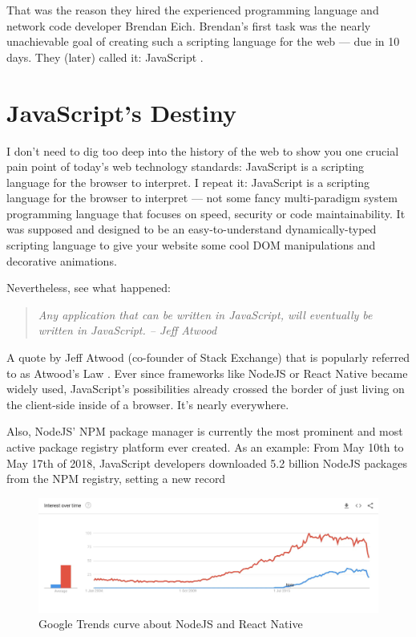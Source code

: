 \documentclass[10pt]{article}
\begin{document}
\begin{sloppypar}
  That was the reason they hired the experienced programming language and network code developer Brendan Eich. Brendan’s first task was the nearly unachievable goal of creating such a scripting language for the web — due in 10 days. They (later) called it: JavaScript \citep{severance_javascript_2012}.

  \section{JavaScript’s Destiny}
  \label{sec:javascript-destiny}

  I don’t need to dig too deep into the history of the web to show you one crucial pain point of today’s web technology standards: JavaScript is a scripting language for the browser to interpret. I repeat it: JavaScript is a scripting language for the browser to interpret — not some fancy multi-paradigm system programming language that focuses on speed, security or code maintainability. It was supposed and designed to be an easy-to-understand dynamically-typed scripting language to give your website some cool DOM manipulations and decorative animations.

  Nevertheless, see what happened:

  \begin{quote}
    \emph{Any application that can be written in JavaScript, will eventually be written in JavaScript. – Jeff Atwood}
  \end{quote}

  A quote by Jeff Atwood (co-founder of Stack Exchange) that is popularly referred to as Atwood’s Law \citep{atwood_principle_2007}. Ever since frameworks like NodeJS or React Native became widely used, JavaScript’s possibilities already crossed the border of just living on the client-side inside of a browser. It’s nearly everywhere.

  Also, NodeJS’ NPM package manager is currently the most prominent and most active package registry platform ever created. As an example: From May 10th to May 17th of 2018, JavaScript developers downloaded 5.2 billion NodeJS packages from the NPM registry, setting a new record \citep{npm_inc_how_2018}

  \begin{figure}[ht]
    \centering
    \includegraphics[width=\textwidth]{figures/003.jpg}
    \caption{Google Trends curve about NodeJS and React Native}
    \label{fig:atwood-law}
  \end{figure}


\end{sloppypar}
\end{document}
